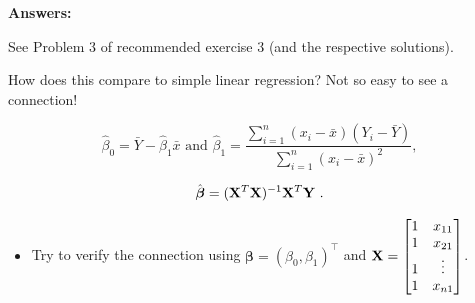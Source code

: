 \documentclass[10pt,ignorenonframetext,]{beamer}
\providecommand{\tightlist}{%
  \setlength{\itemsep}{0pt}\setlength{\parskip}{0pt}}
\begin{document}
\begin{frame}

\textbf{Answers:}

See Problem 3 of recommended exercise 3 (and the respective solutions).

\end{frame}

\begin{frame}

How does this compare to simple linear regression? Not so easy to see a
connection!

\[\hat{\beta}_0 = \bar{Y}-\hat{\beta}_1 \bar{x} \text{ and } \hat{\beta}_1 = \frac{\sum_{i=1}^n(x_i-\bar{x})(Y_i-\bar{Y})}{\sum_{i=1}^n(x_i-\bar{x})^2},\]

\[ \hat{\boldsymbol\beta}=({\bf X}^T{\bf X})^{-1} {\bf X}^T {\bf Y} \ .\]

\begin{itemize}
\tightlist
\item
  Try to verify the connection using
  \(\boldsymbol\beta=(\beta_0,\beta_1)^\top\) and
  \({\bf X}= \left[\begin{matrix} 1 & x_{11} \\ 1 & x_{21} \\ 1 & \vdots \\ 1 & x_{n1} \\ \end{matrix}\right]\).
\end{itemize}

\end{frame}
\end{document}
